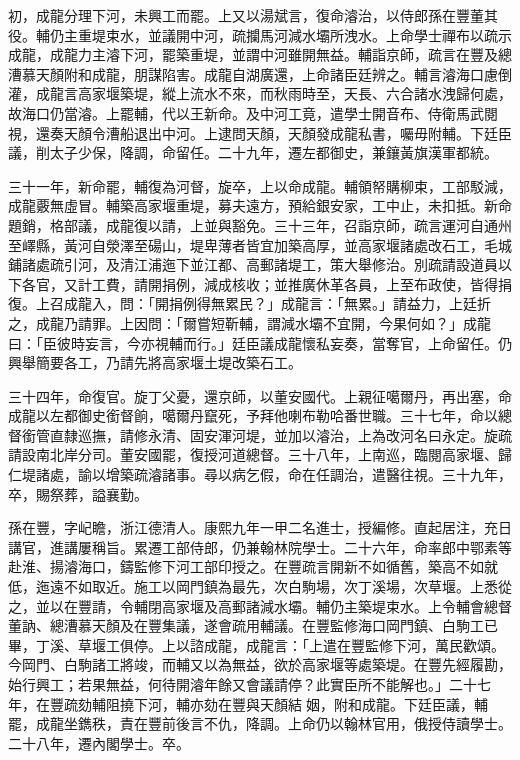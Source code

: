 \begin{pinyinscope}
初，成龍分理下河，未興工而罷。上又以湯斌言，復命濬治，以侍郎孫在豐董其役。輔仍主重堤束水，並議開中河，疏攔馬河減水壩所洩水。上命學士禪布以疏示成龍，成龍力主濬下河，罷築重堤，並謂中河雖開無益。輔詣京師，疏言在豐及總漕慕天顏附和成龍，朋謀陷害。成龍自湖廣還，上命諸臣廷辨之。輔言濬海口慮倒灌，成龍言高家堰築堤，縱上流水不來，而秋雨時至，天長、六合諸水洩歸何處，故海口仍當濬。上罷輔，代以王新命。及中河工竟，遣學士開音布、侍衛馬武閱視，還奏天顏令漕船退出中河。上逮問天顏，天顏發成龍私書，囑毋附輔。下廷臣議，削太子少保，降調，命留任。二十九年，遷左都御史，兼鑲黃旗漢軍都統。

三十一年，新命罷，輔復為河督，旋卒，上以命成龍。輔領帑購柳束，工部駁減，成龍覈無虛冒。輔築高家堰重堤，募夫遠方，預給銀安家，工中止，未扣抵。新命題銷，格部議，成龍復以請，上並與豁免。三十三年，召詣京師，疏言運河自通州至嶧縣，黃河自滎澤至碭山，堤卑薄者皆宜加築高厚，並高家堰諸處改石工，毛城鋪諸處疏引河，及清江浦迤下並江都、高郵諸堤工，策大舉修治。別疏請設道員以下各官，又計工費，請開捐例，減成核收；並推廣休革各員，上至布政使，皆得捐復。上召成龍入，問：「開捐例得無累民？」成龍言：「無累。」請益力，上廷折之，成龍乃請罪。上因問：「爾嘗短靳輔，謂減水壩不宜開，今果何如？」成龍曰：「臣彼時妄言，今亦視輔而行。」廷臣議成龍懷私妄奏，當奪官，上命留任。仍興舉簡要各工，乃請先將高家堰土堤改築石工。

三十四年，命復官。旋丁父憂，還京師，以董安國代。上親征噶爾丹，再出塞，命成龍以左都御史銜督餉，噶爾丹竄死，予拜他喇布勒哈番世職。三十七年，命以總督銜管直隸巡撫，請修永清、固安渾河堤，並加以濬治，上為改河名曰永定。旋疏請設南北岸分司。董安國罷，復授河道總督。三十八年，上南巡，臨閱高家堰、歸仁堤諸處，諭以增築疏濬諸事。尋以病乞假，命在任調治，遣醫往視。三十九年，卒，賜祭葬，謚襄勤。

孫在豐，字屺瞻，浙江德清人。康熙九年一甲二名進士，授編修。直起居注，充日講官，進講屢稱旨。累遷工部侍郎，仍兼翰林院學士。二十六年，命率郎中鄂素等赴淮、揚濬海口，鑄監修下河工部印授之。在豐疏言開新不如循舊，築高不如就低，迤遠不如取近。施工以岡門鎮為最先，次白駒場，次丁溪場，次草堰。上悉從之，並以在豐請，令輔閉高家堰及高郵諸減水壩。輔仍主築堤束水。上令輔會總督董訥、總漕慕天顏及在豐集議，遂會疏用輔議。在豐監修海口岡門鎮、白駒工已畢，丁溪、草堰工俱停。上以諮成龍，成龍言：「上遣在豐監修下河，萬民歡頌。今岡門、白駒諸工將竣，而輔又以為無益，欲於高家堰等處築堤。在豐先經履勘，始行興工；若果無益，何待開濬年餘又會議請停？此實臣所不能解也。」二十七年，在豐疏劾輔阻撓下河，輔亦劾在豐與天顏結姻，附和成龍。下廷臣議，輔罷，成龍坐鐫秩，責在豐前後言不仇，降調。上命仍以翰林官用，俄授侍讀學士。二十八年，遷內閣學士。卒。


\end{pinyinscope}
